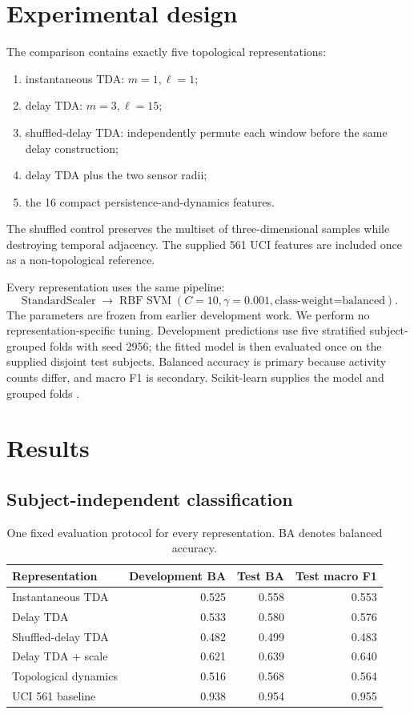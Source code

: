 \documentclass[11pt,a4paper]{article}
\begin{document}
\section{Experimental design}

The comparison contains exactly five topological representations:
\begin{enumerate}
  \item instantaneous TDA: $m=1,\ell=1$;
  \item delay TDA: $m=3,\ell=15$;
  \item shuffled-delay TDA: independently permute each window before the same delay construction;
  \item delay TDA plus the two sensor radii;
  \item the 16 compact persistence-and-dynamics features.
\end{enumerate}
The shuffled control preserves the multiset of three-dimensional samples while destroying temporal adjacency. The supplied 561 UCI features are included once as a non-topological reference.

Every representation uses the same pipeline:
\[
\operatorname{StandardScaler}\longrightarrow
\operatorname{RBF\ SVM}(C=10,\gamma=0.001,
\text{class-weight=balanced}).
\]
The parameters are frozen from earlier development work. We perform no representation-specific tuning. Development predictions use five stratified subject-grouped folds with seed 2956; the fitted model is then evaluated once on the supplied disjoint test subjects. Balanced accuracy is primary because activity counts differ, and macro F1 is secondary. Scikit-learn supplies the model and grouped folds \cite{scikit-learn}.

\section{Results}

\subsection{Subject-independent classification}

\begin{table}[H]
\centering
\caption{One fixed evaluation protocol for every representation. BA denotes balanced accuracy.}
\label{tab:classification}
\begin{tabular}{lrrr}
\toprule
Representation & Development BA & Test BA & Test macro F1 \\
\midrule
Instantaneous TDA & 0.525 & 0.558 & 0.553 \\
Delay TDA & 0.533 & 0.580 & 0.576 \\
Shuffled-delay TDA & 0.482 & 0.499 & 0.483 \\
Delay TDA + scale & 0.621 & 0.639 & 0.640 \\
Topological dynamics & 0.516 & 0.568 & 0.564 \\
UCI 561 baseline & 0.938 & 0.954 & 0.955 \\
\bottomrule
\end{tabular}
\end{table}
\end{document}
